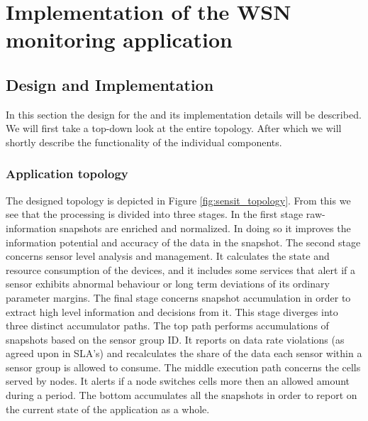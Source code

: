



	
\section{Implementation of the WSN monitoring application}
\subsection{Design and Implementation}
In this section the design for the \nedap \sensit and its implementation details will be described. We will first take a top-down look at the entire topology. After which we will shortly describe the functionality of the individual components.

\subsubsection{Application topology}
The designed topology is depicted in Figure \ref{fig:sensit_topology}. From this we see that the processing is divided into three stages. In the first stage raw-information snapshots are enriched and normalized. In doing so it improves the information potential and accuracy of the data in the snapshot. The second stage concerns sensor level analysis and management. It calculates the state and resource consumption of the devices, and it includes some services that alert if a sensor exhibits abnormal behaviour or long term deviations of its ordinary parameter margins. The final stage concerns snapshot accumulation in order to extract high level information and decisions from it. This stage diverges into three distinct accumulator paths. The top path performs accumulations of snapshots based on the sensor group ID. It reports on data rate violations (as agreed upon in SLA's) and recalculates the share of the data each sensor within a sensor group is allowed to consume. The middle execution path concerns the cells served by nodes. It alerts if a node switches cells more then an allowed amount during a period. The bottom accumulates all the snapshots in order to report on the current state of the application as a whole.


